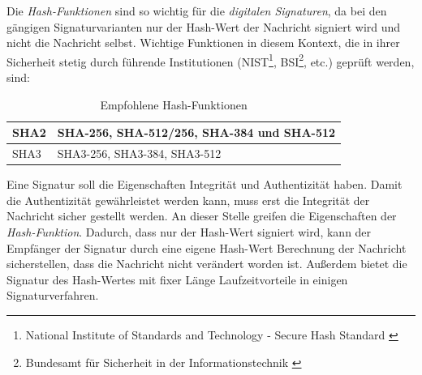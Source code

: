 \documentclass[11pt,a4paper,ngerman]{report}
\begin{document}
Die \textit{Hash-Funktionen} sind so wichtig für die \textit{digitalen Signaturen}, da bei den gängigen Signaturvarianten nur der Hash-Wert der Nachricht signiert wird und nicht die Nachricht selbst. Wichtige Funktionen in diesem Kontext, die in ihrer Sicherheit stetig durch führende Institutionen (NIST\footnote{National Institute of Standards and Technology - Secure Hash Standard \cite{shs180-4}}, BSI\footnote{Bundesamt für Sicherheit in der Informationstechnik \cite[Kapitel 4]{bsi-tr-02102-1}}, etc.) geprüft werden, sind:
\begin{table}[h]
    \begin{tabularx}{\textwidth}{ |X|X| }
        \hline
        SHA2 & SHA-256, SHA-512/256, SHA-384 und SHA-512 \\
        \hline
        SHA3 & SHA3-256, SHA3-384, SHA3-512 \\
        \hline
    \end{tabularx}
    \caption{Empfohlene Hash-Funktionen}
    \label{table:Hashfunktionen}
\end{table}

Eine Signatur soll die Eigenschaften Integrität und Authentizität haben. Damit die Authentizität gewährleistet werden kann, muss erst die Integrität der Nachricht sicher gestellt werden. An dieser Stelle greifen die Eigenschaften der \textit{Hash-Funktion}. Dadurch, dass nur der Hash-Wert signiert wird, kann der Empfänger der Signatur durch eine eigene Hash-Wert Berechnung der Nachricht sicherstellen, dass die Nachricht nicht verändert worden ist. Außerdem bietet die Signatur des Hash-Wertes mit fixer Länge Laufzeitvorteile in einigen Signaturverfahren.
\end{document}
